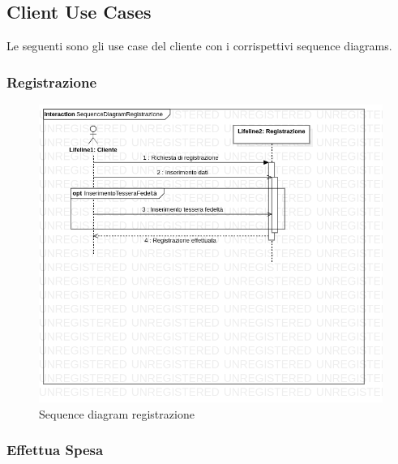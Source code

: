 \documentclass[12pt, a4paper]{article}
\numberwithin{equation}{section} %
\begin{document}
\subsection{Client Use Cases}

Le seguenti sono gli use case del cliente con i corrispettivi sequence diagrams.

\subsubsection{Registrazione}

\begin{figure}[h]
\centering
\includegraphics[width=\textwidth]{Use Case Model!Registrazione!InteractionRegistrazione!SequenceDiagramRegistrazione_1.png}
\caption{Sequence diagram registrazione}
\end{figure}

\subsubsection{Effettua Spesa}
\end{document}

